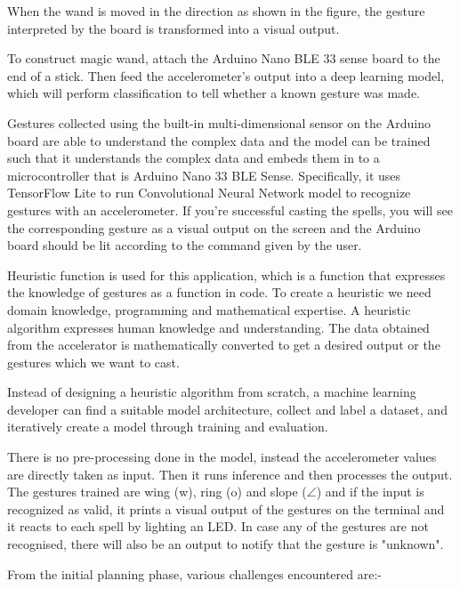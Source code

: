 When the wand is moved in the direction as shown in the figure, the gesture interpreted by the board is transformed into a visual output. 

To construct magic wand, attach the Arduino Nano BLE 33 sense board to the end of a stick. Then feed the accelerometer’s output into a deep learning model, which will perform classification to tell whether a known gesture was made. \cite{Warden:2020}


Gestures collected using the built-in multi-dimensional sensor on the Arduino board are able to understand the complex data and the model can be trained such that it understands the complex data and embeds them in to a microcontroller that is Arduino Nano 33 BLE Sense. Specifically, it uses TensorFlow Lite to run Convolutional Neural Network model to recognize gestures with an accelerometer.  If you’re successful casting the spells, you will see the corresponding gesture as a visual output on the screen and the Arduino board should be lit according to the command given by the user.



Heuristic function is used for this application, which is a function that expresses the knowledge of gestures as a function in code. To create a heuristic we need domain knowledge, programming and mathematical expertise. A heuristic algorithm expresses human knowledge and understanding. The data obtained from the accelerator is mathematically converted to get a desired output or the gestures which we want to cast. 

Instead of designing a heuristic algorithm from scratch, a machine learning developer can find a suitable model architecture, collect and label a dataset, and iteratively create a model through training and evaluation. \cite{Warden:2020}


There is no pre-processing done in the model, instead the accelerometer values are directly taken as input. Then it runs inference and then processes the output. The gestures trained are wing (w), ring (o) and  slope ($\angle$) and if the input is recognized as valid, it prints a visual output of the gestures on the terminal and it reacts to each spell by lighting an LED. In case any of the gestures are not recognised, there will also be an output to notify that the gesture is "unknown".


From the initial planning phase, various challenges encountered are:-

